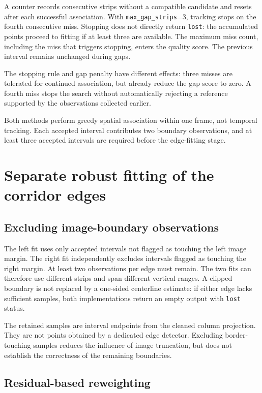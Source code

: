 A counter records consecutive strips without a compatible candidate and
resets after each successful association. With
\texttt{max\_gap\_strips}=3, tracking stops on the fourth consecutive
miss. Stopping does not directly return \texttt{lost}: the accumulated
points proceed to fitting if at least three are available. The maximum
miss count, including the miss that triggers stopping, enters the quality
score. The previous interval remains unchanged during gaps.

The stopping rule and gap penalty have different effects: three misses
are tolerated for continued association, but already reduce the gap
score to zero. A fourth miss stops the search without automatically
rejecting a reference supported by the observations collected earlier.

Both methods perform greedy spatial association within one frame, not
temporal tracking. Each accepted interval contributes two boundary
observations, and at least three accepted intervals are required before
the edge-fitting stage.

\section{Separate robust fitting of the corridor edges}
\label{sec:c4_fitting}

\subsection{Excluding image-boundary observations}
\label{subsec:c4_edge_samples}

The left fit uses only accepted intervals not flagged as touching the
left image margin. The right fit independently excludes intervals
flagged as touching the right margin. At least two observations per edge
must remain. The two fits can therefore use different strips and span
different vertical ranges. A clipped boundary is not replaced by a
one-sided centerline estimate: if either edge lacks sufficient samples,
both implementations return an empty output with \texttt{lost} status.

The retained samples are interval endpoints from the cleaned column
projection. They are not points obtained by a dedicated edge detector.
Excluding border-touching samples reduces the influence of image
truncation, but does not establish the correctness of the remaining
boundaries.

\subsection{Residual-based reweighting}
\label{subsec:c4_robust_fit}

